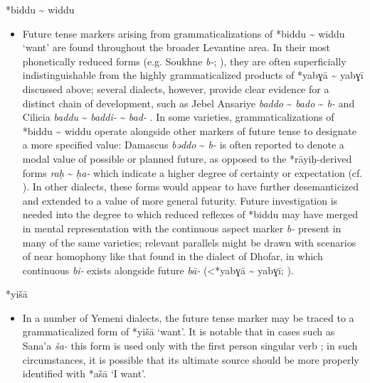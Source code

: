 \documentclass[output=paper]{langsci/langscibook}
\begin{document}
*biddu {\textasciitilde} widdu

\begin{itemize}

  \item[]
Future tense markers arising from grammaticalizations of *biddu {\textasciitilde} widdu ‘want’ are found throughout the broader Levantine area. In their most phonetically reduced forms (e.g. Soukhne \textit{b-}; \citealt{Behnstedt1994Soukhne}), they are often superficially indistinguishable from the highly grammaticalized products of *yabɣā {\textasciitilde} yabɣī discussed above; several dialects, however, provide clear evidence for a distinct chain of development, such as Jebel Ansariye \textit{baddo} {\textasciitilde} \textit{bado} {\textasciitilde} \textit{b-} \citep{Lewin1969} and Cilicia \textit{baddu} {\textasciitilde} \textit{baddi-} {\textasciitilde} \textit{bad-} \citep{Procházka2011Cilician}. In some varieties, grammaticalizations of *biddu {\textasciitilde} widdu operate alongside other markers of future tense to designate a more specified value: Damascus \textit{bǝ}\textit{ddo} {\textasciitilde} \textit{b-} is often reported to denote a modal value of possible or planned future, as opposed to the *rāyiḥ{}-derived forms \textit{raḥ} {\textasciitilde} \textit{ḥa-} which indicate a higher degree of certainty or expectation (cf. \citealt{Lentin2011Damascus}). In other dialects, these forms would appear to have further desemanticized and extended to a value of more general futurity.  Future investigation is needed into the degree to which reduced reflexes of *biddu may have merged in mental representation with the continuous aspect marker \textit{b-} present in many of the same varieties; relevant parallels might be drawn with scenarios of near homophony like that found in the dialect of Dhofar, in which continuous \textit{bi-} exists alongside future \textit{bā}\textit{{}-} (<*yabɣā {\textasciitilde} yabɣī; \citealt{Davey2016}).
\end{itemize}
 
*yišā

\begin{itemize}

  \item[]
In a number of Yemeni dialects, the future tense marker may be traced to a grammaticalized form of *yišā ‘want’. It is notable that in cases such as Sana’a \textit{ša-} this form is used only with the first person singular verb \citep{Watson1993}; in such circumstances, it is possible that its ultimate source should be more properly identified with *ašā ‘I want’.
\end{itemize}
 
\end{document}
